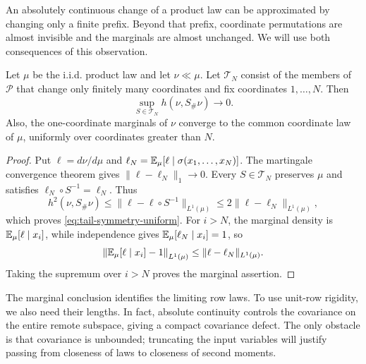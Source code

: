 An absolutely continuous change of a product law can be approximated by
changing only a finite prefix. Beyond that prefix, coordinate permutations
are almost invisible and the marginals are almost unchanged. We will use
both consequences of this observation.

\begin{lemma}
\label{lem:tail-symmetry-uniform}
Let $\mu$ be the i.i.d. product law and let $\nu\ll\mu$.  Let
$\mathcal T_N$ consist of the members of $\mathcal P$ that change only
finitely many coordinates and fix coordinates $1,\ldots,N$.
Then
\begin{equation}
 \sup_{S\in\mathcal T_N}h(\nu,S_\#\nu)\longrightarrow0.
 \label{eq:tail-symmetry-uniform}
\end{equation}
Also, the one-coordinate marginals of $\nu$ converge to the common
coordinate law of $\mu$, uniformly over coordinates greater than $N$.
\end{lemma}
\begin{proof}
Put $\ell=d\nu/d\mu$ and
$\ell_N=\mathbb E_\mu[\ell\mid\sigma(x_1,\ldots,x_N)]$.  The martingale
convergence theorem gives $\|\ell-\ell_N\|_1\to0$.  Every
$S\in\mathcal T_N$ preserves $\mu$ and satisfies
$\ell_N\circ S^{-1}=\ell_N$.  Thus
\[
 h^2(\nu,S_\#\nu)
 \leq\|\ell-\ell\circ S^{-1}\|_{L^1(\mu)}
 \leq2\|\ell-\ell_N\|_{L^1(\mu)},
\]
which proves \eqref{eq:tail-symmetry-uniform}.
For $i>N$, the marginal density is
$\mathbb E_\mu[\ell\mid x_i]$, while independence gives
$\mathbb E_\mu[\ell_N\mid x_i]=1$, so
\[
 \left\|\mathbb E_\mu[\ell\mid x_i]-1\right\|_{L^1(\mu)}
 \leq\|\ell-\ell_N\|_{L^1(\mu)}.
\]
Taking the supremum over $i>N$ proves the marginal assertion.
\end{proof}

The marginal conclusion identifies the limiting row laws. To use unit-row
rigidity, we also need their lengths. In fact, absolute continuity controls
the covariance on the entire remote subspace, giving a compact covariance
defect. The only obstacle is that covariance is unbounded; truncating the
input variables will justify passing from closeness of laws to closeness
of second moments.

